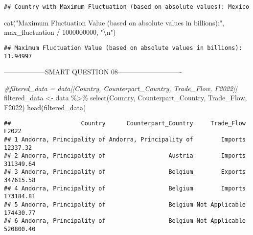 \documentclass[
]{article}
\newenvironment{Shaded}{\begin{snugshade}}{\end{snugshade}}
\newcommand{\CommentTok}[1]{\textcolor[rgb]{0.56,0.35,0.01}{\textit{#1}}}
\newcommand{\DecValTok}[1]{\textcolor[rgb]{0.00,0.00,0.81}{#1}}
\newcommand{\FunctionTok}[1]{\textcolor[rgb]{0.00,0.00,0.00}{#1}}
\newcommand{\NormalTok}[1]{#1}
\newcommand{\OtherTok}[1]{\textcolor[rgb]{0.56,0.35,0.01}{#1}}
\newcommand{\SpecialCharTok}[1]{\textcolor[rgb]{0.00,0.00,0.00}{#1}}
\newcommand{\StringTok}[1]{\textcolor[rgb]{0.31,0.60,0.02}{#1}}
\begin{document}
\begin{verbatim}
## Country with Maximum Fluctuation (based on absolute values): Mexico
\end{verbatim}

\begin{Shaded}
\begin{Highlighting}[]
\FunctionTok{cat}\NormalTok{(}\StringTok{"Maximum Fluctuation Value (based on absolute values in billions):"}\NormalTok{, max\_fluctuation }\SpecialCharTok{/} \DecValTok{1000000000}\NormalTok{, }\StringTok{"}\SpecialCharTok{\textbackslash{}n}\StringTok{"}\NormalTok{)}
\end{Highlighting}
\end{Shaded}

\begin{verbatim}
## Maximum Fluctuation Value (based on absolute values in billions): 11.94997
\end{verbatim}

------------------SMART QUESTION 08----------------------------

\begin{Shaded}
\begin{Highlighting}[]
\CommentTok{\#filtered\_data = data[[\textquotesingle{}Country\textquotesingle{}, \textquotesingle{}Counterpart\_Country\textquotesingle{}, \textquotesingle{}Trade\_Flow\textquotesingle{}, \textquotesingle{}F2022\textquotesingle{}]]}
\NormalTok{filtered\_data }\OtherTok{\textless{}{-}}\NormalTok{ data }\SpecialCharTok{\%\textgreater{}\%}
  \FunctionTok{select}\NormalTok{(Country, Counterpart\_Country, Trade\_Flow, F2022)}
\FunctionTok{head}\NormalTok{(filtered\_data)}
\end{Highlighting}
\end{Shaded}

\begin{verbatim}
##                    Country      Counterpart_Country     Trade_Flow     F2022
## 1 Andorra, Principality of Andorra, Principality of        Imports  12337.32
## 2 Andorra, Principality of                  Austria        Imports 311349.64
## 3 Andorra, Principality of                  Belgium        Exports 347615.58
## 4 Andorra, Principality of                  Belgium        Imports 173184.81
## 5 Andorra, Principality of                  Belgium Not Applicable 174430.77
## 6 Andorra, Principality of                  Belgium Not Applicable 520800.40
\end{verbatim}
\end{document}
